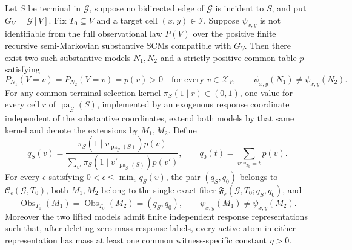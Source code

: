 Let \(S\) be terminal in \(\mathcal G\), suppose no bidirected edge of \(\mathcal G\) is incident to \(S\), and put \(G_V=\mathcal G[V]\). Fix \(T_0\subseteq V\) and a target cell \((x,y)\in\mathcal I\). Suppose \(\psi_{x,y}\) is not identifiable from the full observational law \(P(V)\) over the positive finite recursive semi-Markovian substantive SCMs compatible with \(G_V\). Then there exist two such substantive models \(N_1,N_2\) and a strictly positive common table \(p\) satisfying
\[
 P_{N_1}(V=v)=P_{N_2}(V=v)=p(v)>0\quad\text{for every }v\in\mathcal X_V,
 \qquad
 \psi_{x,y}(N_1)\ne\psi_{x,y}(N_2).
\]
For any common terminal selection kernel \(\pi_S(1\mid r)\in(0,1)\), one value for every cell \(r\) of \(\operatorname{pa}_{\mathcal G}(S)\), implemented by an exogenous response coordinate independent of the substantive coordinates, extend both models by that same kernel and denote the extensions by \(M_1,M_2\). Define
\[
 q_S(v)=\frac{\pi_S(1\mid v_{\operatorname{pa}_{\mathcal G}(S)})p(v)}
 {\sum_{v'}\pi_S(1\mid v'_{\operatorname{pa}_{\mathcal G}(S)})p(v')},
 \qquad
 q_0(t)=\sum_{v:v_{T_0}=t}p(v).
\]
For every \(\epsilon\) satisfying \(0<\epsilon\leq\min_v q_S(v)\), the pair \((q_S,q_0)\) belongs to \(\mathcal C_{\epsilon}(\mathcal G,T_0)\), both \(M_1,M_2\) belong to the single exact fiber \(\mathfrak F_{\epsilon}(\mathcal G,T_0;q_S,q_0)\), and
\[
 \operatorname{Obs}_{T_0}(M_1)=\operatorname{Obs}_{T_0}(M_2)=(q_S,q_0),
 \qquad
 \psi_{x,y}(M_1)\ne\psi_{x,y}(M_2).
\]
Moreover the two lifted models admit finite independent response representations such that, after deleting zero-mass response labels, every active atom in either representation has mass at least one common witness-specific constant \(\eta>0\).
